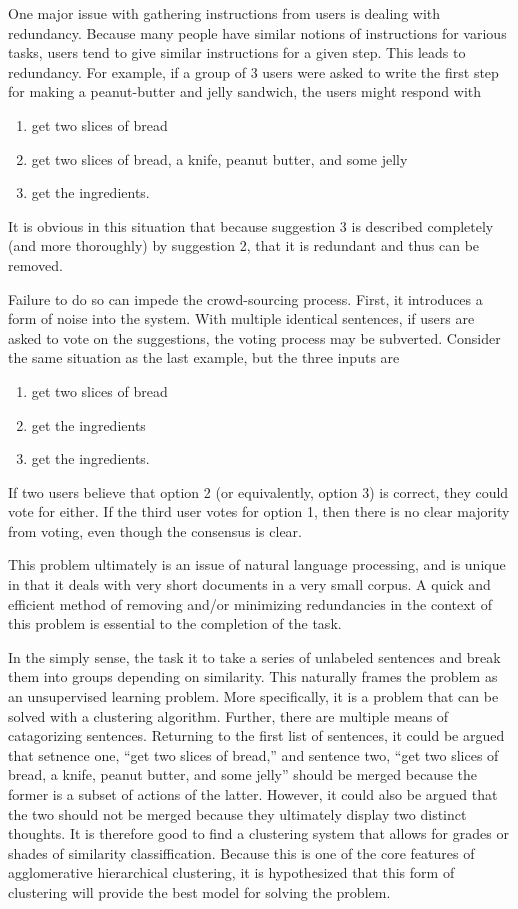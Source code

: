 One major issue with gathering instructions from users is dealing with redundancy.
Because many people have similar notions of instructions for various tasks, users tend to give similar instructions for a given step.
This leads to redundancy. For example, if a group of 3 users were asked to write the first step for making a peanut-butter and jelly sandwich, the users might respond with
\begin{enumerate}
\item get two slices of bread
\item get two slices of bread, a knife, peanut butter, and some jelly
\item get the ingredients.
\end{enumerate}
It is obvious in this situation that because suggestion 3 is described completely (and more thoroughly) by suggestion 2, that it is redundant and thus can be removed.

Failure to do so can impede the crowd-sourcing process.
First, it introduces a form of noise into the system.
With multiple identical sentences, if users are asked to vote on the suggestions, the voting process may be subverted.
Consider the same situation as the last example, but the three inputs are
\begin{enumerate}
\item get two slices of bread
\item get the ingredients
\item get the ingredients.
\end{enumerate}
If two users believe that option 2 (or equivalently, option 3) is correct, they could vote for either. 
If the third user votes for option 1, then there is no clear majority from voting, even though the consensus is clear.

This problem ultimately is an issue of natural language processing, and is unique in that it deals with very short documents in a very small corpus. 
A quick and efficient method of removing and/or minimizing redundancies in the context of this problem is essential to the completion of the task.

In the simply sense, the task it to take a series of unlabeled sentences and break them into groups depending on similarity.
This naturally frames the problem as an unsupervised learning problem.
More specifically, it is a problem that can be solved with a clustering algorithm.
Further, there are multiple means of catagorizing sentences. 
Returning to the first list of sentences, it could be argued that setnence one, ``get two slices of bread,'' and sentence two, ``get two slices of bread, a knife, peanut butter, and some jelly'' should be merged because the former is a subset of actions of the latter.
However, it could also be argued that the two should not be merged because they ultimately display two distinct thoughts.
It is therefore good to find a clustering system that allows for grades or shades of similarity classiffication.
Because this is one of the core features of agglomerative  hierarchical clustering, it is hypothesized that this form of clustering will provide the best model for solving the problem.

